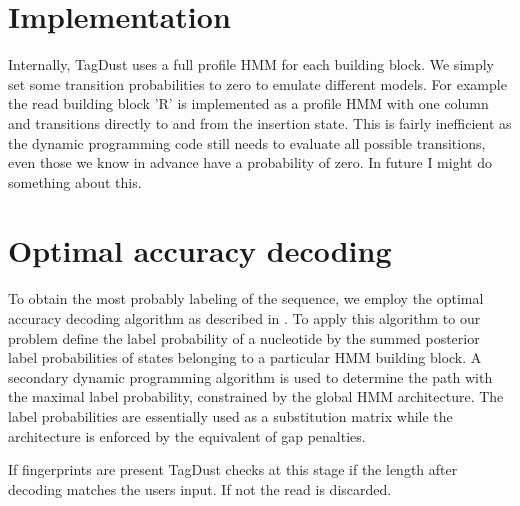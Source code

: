 \documentclass[11pt,a4paper,oneside]{book}
\begin{document}
\section{Implementation} 

Internally, TagDust uses a full profile HMM for each building block. We simply set some transition probabilities to zero to emulate different models. For example the read building block 'R' is implemented as a profile HMM with one column and transitions directly to and from the insertion state.
This is fairly inefficient as the dynamic programming code still needs to evaluate all possible transitions, even those we know in advance have a probability of zero. In future I might do something about this. 

\section{Optimal accuracy decoding} 

To obtain the most probably labeling of the sequence, we employ the optimal accuracy decoding algorithm as described in \citep{Kall:2005vg}. To apply this algorithm to our problem define the label probability of a nucleotide by the summed posterior label probabilities of states belonging to a particular HMM building block. A secondary dynamic programming algorithm is used to determine the path with the maximal label probability, constrained by the global HMM architecture. The label probabilities are essentially used as a substitution matrix while the architecture is enforced by the equivalent of gap penalties. 

If fingerprints are present TagDust checks at this stage if the length after decoding matches the users input. If not the read is discarded. 



\end{document}
